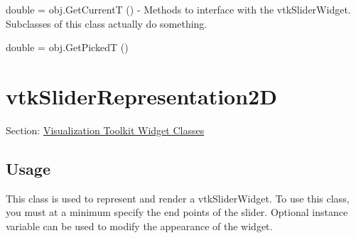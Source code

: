 \begin{DoxyItemize}
\item {\ttfamily double = obj.\-Get\-Current\-T ()} -\/ Methods to interface with the vtk\-Slider\-Widget. Subclasses of this class actually do something.  
\item {\ttfamily double = obj.\-Get\-Picked\-T ()}  
\end{DoxyItemize}\hypertarget{vtkwidgets_vtksliderrepresentation2d}{}\section{vtk\-Slider\-Representation2\-D}\label{vtkwidgets_vtksliderrepresentation2d}
Section\-: \hyperlink{sec_vtkwidgets}{Visualization Toolkit Widget Classes} \hypertarget{vtkwidgets_vtkxyplotwidget_Usage}{}\subsection{Usage}\label{vtkwidgets_vtkxyplotwidget_Usage}
This class is used to represent and render a vtk\-Slider\-Widget. To use this class, you must at a minimum specify the end points of the slider. Optional instance variable can be used to modify the appearance of the widget.

